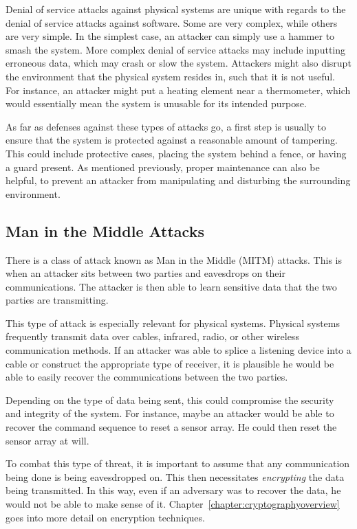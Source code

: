 Denial of service attacks against physical systems are unique with regards to the denial of service attacks against software. Some are very complex,
while others are very simple. In the simplest case, an attacker can simply use a hammer to smash the system. More complex denial of
service attacks may include inputting erroneous data, which may crash or slow the system. Attackers might also disrupt the environment
that the physical system resides in, such that it is not useful. For instance, an attacker might put a heating element near a thermometer,
which would essentially mean the system is unusable for its intended purpose.

As far as defenses against these types of attacks go, a first step is usually to ensure that the system is protected against a reasonable
amount of tampering. This could include protective cases, placing the system behind a fence, or having a guard present. As mentioned
previously, proper maintenance can also be helpful, to prevent an attacker from manipulating and disturbing the surrounding
environment.

\subsection{Man in the Middle Attacks}

There is a class of attack known as Man in the Middle (MITM) attacks. This is when an attacker sits between two parties and eavesdrops
on their communications. The attacker is then able to learn sensitive data that the two parties are transmitting.

This type of attack is especially relevant for physical systems. Physical systems frequently transmit data over cables, infrared, radio, or
other wireless communication methods. If an attacker was able to splice a listening device into a cable or construct the appropriate type
of receiver, it is plausible he would be able to easily recover the communications between the two parties. 

Depending on the type of data
being sent, this could compromise the security and integrity of the system. For instance, maybe an attacker would be able to recover the
command sequence to reset a sensor array. He could then reset the sensor array at will.

To combat this type of threat, it is important to assume that any communication being done is being eavesdropped on. This then
necessitates \textit{encrypting} the data being transmitted. In this way, even if an adversary was to recover the data, he would not be
able to make sense of it. Chapter~\ref{chapter:cryptographyoverview} goes into more detail on encryption techniques.

